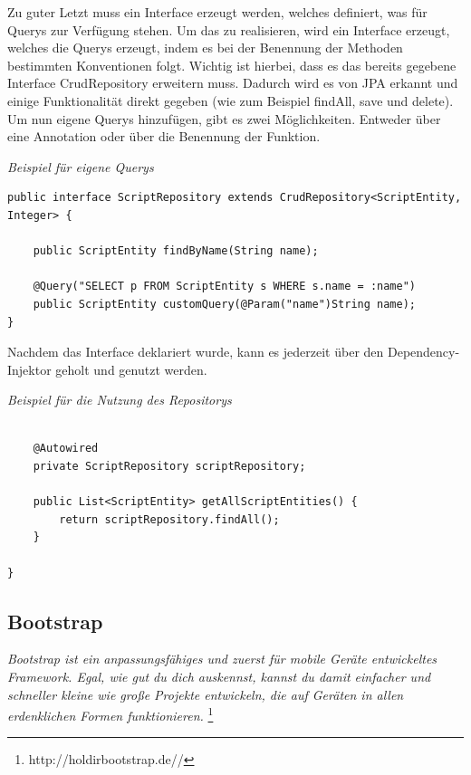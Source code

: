 Zu guter Letzt muss ein Interface erzeugt werden, welches definiert, was für Querys zur Verfügung stehen. Um das zu realisieren, wird ein Interface erzeugt, welches die Querys erzeugt, indem es bei der Benennung der Methoden bestimmten Konventionen folgt. Wichtig ist hierbei, dass es das bereits gegebene Interface CrudRepository erweitern muss. Dadurch wird es von JPA erkannt und einige Funktionalität direkt gegeben (wie zum Beispiel findAll, save und delete).
Um nun eigene Querys hinzufügen, gibt es zwei Möglichkeiten. Entweder über eine Annotation oder über die Benennung der Funktion. \\

\begin{minipage}{\textwidth}
\emph{Beispiel für eigene Querys}
\begin{lstlisting}
public interface ScriptRepository extends CrudRepository<ScriptEntity, Integer> {

	public ScriptEntity findByName(String name);
	
	@Query("SELECT p FROM ScriptEntity s WHERE s.name = :name")
	public ScriptEntity customQuery(@Param("name")String name);
}
\end{lstlisting}
\end{minipage}

Nachdem das Interface deklariert wurde, kann es jederzeit über den Dependency-Injektor geholt und genutzt werden.\\

\begin{minipage}{\textwidth}
\emph{Beispiel für die Nutzung des Repositorys}
\begin{lstlisting}

	@Autowired
	private ScriptRepository scriptRepository;
	
	public List<ScriptEntity> getAllScriptEntities() {
		return scriptRepository.findAll();
	}
	
}
\end{lstlisting}
\end{minipage}

\subsection{Bootstrap}

\emph{\glqq   
Bootstrap ist ein anpassungsfähiges und zuerst für mobile Geräte entwickeltes Framework. Egal, wie gut du dich auskennst, kannst du damit einfacher und schneller kleine wie große Projekte entwickeln, die auf Geräten in allen erdenklichen Formen funktionieren.
\grqq} \footnote{http://holdirbootstrap.de//} \\

